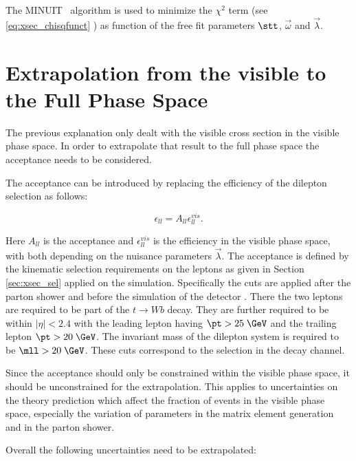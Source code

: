 The MINUIT~\cite{James:1975dr} algorithm is used to minimize the  $\chi^2$ term (see \ref{eq:xsec_chisqfunct} ) as function of the free fit parameters $\stt$, $\vec{\omega}$
and $\vec{\lambda}$. 



\section{Extrapolation from the visible to the Full Phase Space}
\label{sec:xsec_extraction}

The previous explanation only dealt with the visible cross section in the visible phase space. In order to extrapolate that result to the full phase space the acceptance
needs to be considered.

The acceptance can be introduced by replacing the efficiency of the dilepton selection as follows:

\begin{equation}
\epsilon_{ll} = A_{ll} \epsilon^{vis}_{ll}.
\label{eq:epsacc}
\end{equation}

Here $A_{ll}$ is the acceptance and $\epsilon^{vis}_{ll}$ is the efficiency in the visible phase space, with both depending on the nuisance parameters $\vec{\lambda}$.
The acceptance is defined by the kinematic selection requirements on the leptons as given in Section \ref{sec:xsec_sel} applied on the simulation. Specifically the cuts are applied after the parton shower and before the simulation of the detector . There the two leptons are required to be part of the $t \rightarrow W b$ decay. They are further required to be within $|\eta|< 2.4$ with the 
leading lepton having $\pt > 25 \; \GeV$ and the trailing lepton $\pt > 20 \; \GeV$. The invariant mass of the dilepton system is required to be $\mll > 20 \; \GeV$.
These cuts correspond to the selection in the \emu decay channel.

Since the acceptance should only be constrained within the visible phase space, it should be unconstrained for the extrapolation.
This applies to uncertainties on the theory prediction which affect the fraction of events in the visible phase space, especially the variation
of parameters in the matrix element generation and in the parton shower.

Overall the following uncertainties need to be extrapolated: 

